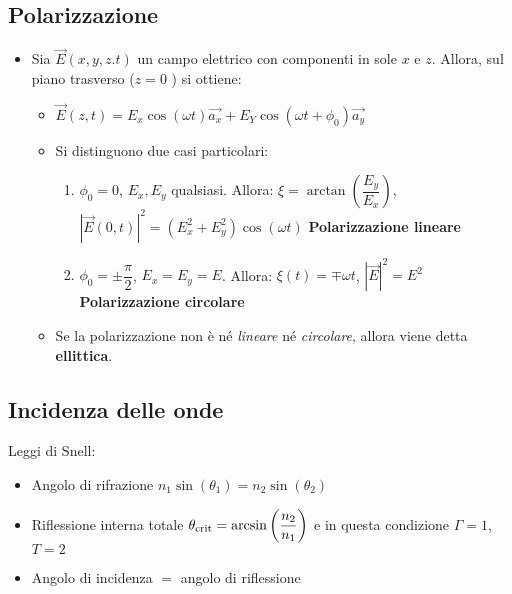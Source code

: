 \documentclass{article}
\begin{document}
\subsection{Polarizzazione}
\begin{itemize}
	\item Sia \( \vec{E}(x, y, z. t) \) un campo elettrico con componenti in sole \( x \) e \( z \). Allora, sul piano trasverso (\( z = 0\) ) si ottiene:
	      \begin{itemize}
		      \item \( \vec{E}(z, t) = E_x \cos ( \omega t) \vec{a_x} + E_Y \cos( \omega t + \phi_0) \vec{a_y}  \)
		      \item Si distinguono due casi particolari:
		            \begin{enumerate}
			            \item \( \phi_0 = 0 \), \( E_x, E_y \) qualsiasi. Allora: \( \xi  = \arctan\left(\dfrac{E_y}{E_x}\right) \), \( |\vec{E}(0, t)|^2 = (E_x^2 + E_y^2) \cos(\omega t) \) \textbf{Polarizzazione lineare}
			            \item  \( \phi_0 = \pm \dfrac{\pi}{2} \), \( E_x = E_y = E \). Allora: \( \xi(t)  = \mp \omega t \), \( |\vec{E}|^2 = E^2 \) \textbf{Polarizzazione circolare}
		            \end{enumerate}
		      \item Se la polarizzazione non è né \textit{lineare} né \textit{circolare}, allora viene detta \textbf{ellittica}.
	      \end{itemize}
\end{itemize}

\subsection{Incidenza delle onde}
Leggi di Snell:
\begin{itemize}
	\item Angolo di rifrazione \(n_1 \sin(\theta_1) = n_2 \sin(\theta_2) \)
	\item Riflessione interna totale \(\theta_{\textnormal{crit}} = \arcsin\left( \dfrac{n_2}{n_1} \right) \) e in questa condizione \(\Gamma = 1\), \(T = 2\)
	\item Angolo di incidenza \(=\) angolo di riflessione
\end{itemize}
\end{document}
